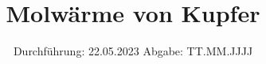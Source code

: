 

\subject{V47}
\title{Molwärme von Kupfer}
\date{%
  Durchführung: 22.05.2023
  \hspace{3em}
  Abgabe: TT.MM.JJJJ
}



\maketitle
\thispagestyle{empty}
\tableofcontents
\newpage
\setcounter{page}{1}







\printbibliography{}



